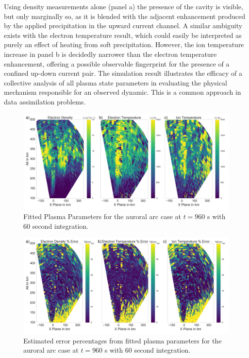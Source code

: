 \documentclass[draft,ras]{agutex}
\begin{document}
\begin{article}
Using density measurements alone (panel a) the presence of the cavity is visible, but only marginally so, as it is blended with the adjacent enhancement produced by the applied precipitation in the upward current channel.  A similar ambiguity exists with the electron temperature result, which could easily be interpreted as purely an effect of heating from soft precipitation. However, the ion temperature increase in panel b is decidedly narrower than the electron temperature enhancement, offering a possible observable fingerprint for the presence of a confined up-down current pair.  The simulation result illustrates the efficacy of a collective analysis of all plasma state parameters in evaluating the physical mechanism responsible for an observed dynamic. This is a common approach in data assimilation problems.


\begin{figure}[!t]
\centering
\includegraphics[width=6in]{0960_60_int}
\caption{Fitted Plasma Parameters for the auroral arc case at $t=960$ s with 60 second integration.}
\label{fig:fplparamst60}
\end{figure}

\begin{figure}[!t]
\centering
\includegraphics[width=6in]{0960_60_int_err}
\caption{Estimated error percentages from fitted plasma parameters for the auroral arc case at $t=960$ s with 60 second integration.}
\label{fig:fplparamst60err}
\end{figure}


\end{article}
\end{document}

